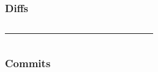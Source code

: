 \documentclass[glossy]{beamer}
\begin{document}
\begin{frame}[fragile=singleslide]
  \frametitle{Diffs}

  \begin{columns}[t]
    \begin{column}{6cm}
      \rule[0.5ex]{\linewidth}{1pt}
    \end{column}

    \begin{column}{6cm}
    \end{column}
  \end{columns}
\end{frame}

\begin{frame}[fragile=singleslide]
  \frametitle{Commits}

  \begin{figure}
    \centering
    
  \end{figure}

\end{frame}
\end{document}
